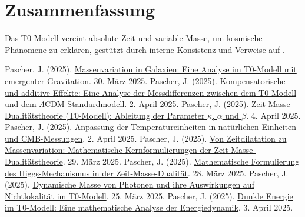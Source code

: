\documentclass[a4paper,12pt]{article}
\theoremstyle{definition}
\theoremstyle{remark}
\begin{document}
	\section{Zusammenfassung}
	
	Das T0-Modell vereint absolute Zeit und variable Masse, um kosmische Phänomene zu erklären, gestützt durch interne Konsistenz und Verweise auf \cite{pascher_galaxies_2025, pascher_params_2025, pascher_messdifferenzen_2025}.
	
	\begin{thebibliography}{99}
		 Pascher, J. (2025). \href{https://github.com/jpascher/T0-Time-Mass-Duality/tree/main/2/pdf/Deutsch/MassVarGalaxien.pdf}{Massenvariation in Galaxien: Eine Analyse im T0-Modell mit emergenter Gravitation}. 30. März 2025.
		 Pascher, J. (2025). \href{https://github.com/jpascher/T0-Time-Mass-Duality/tree/main/2/pdf/Deutsch/MessdifferenzenT0Standard.pdf}{Kompensatorische und additive Effekte: Eine Analyse der Messdifferenzen zwischen dem T0-Modell und dem \(\Lambda\)CDM-Standardmodell}. 2. April 2025.
		 Pascher, J. (2025). \href{https://github.com/jpascher/T0-Time-Mass-Duality/tree/main/2/pdf/Deutsch/ZeitMasseT0Params.pdf}{Zeit-Masse-Dualitätstheorie (T0-Modell): Ableitung der Parameter \(\kappa\), \(\alpha\) und \(\beta\)}. 4. April 2025.
		 Pascher, J. (2025). \href{https://github.com/jpascher/T0-Time-Mass-Duality/tree/main/2/pdf/Deutsch/NatEinheitenAlpha1.pdf}{Anpassung der Temperatureinheiten in natürlichen Einheiten und CMB-Messungen}. 2. April 2025.
		 Pascher, J. (2025). \href{https://github.com/jpascher/T0-Time-Mass-Duality/tree/main/2/pdf/Deutsch/MathZeitMasseLagrange.pdf}{Von Zeitdilatation zu Massenvariation: Mathematische Kernformulierungen der Zeit-Masse-Dualitätstheorie}. 29. März 2025.
		 Pascher, J. (2025). \href{https://github.com/jpascher/T0-Time-Mass-Duality/tree/main/2/pdf/Deutsch/MathHiggsZeitMasse.pdf}{Mathematische Formulierung des Higgs-Mechanismus in der Zeit-Masse-Dualität}. 28. März 2025.
		 Pascher, J. (2025). \href{https://github.com/jpascher/T0-Time-Mass-Duality/tree/main/2/pdf/Deutsch/DynMassePhotonenNichtlokal.pdf}{Dynamische Masse von Photonen und ihre Auswirkungen auf Nichtlokalität im T0-Modell}. 25. März 2025.
		 Pascher, J. (2025). \href{https://github.com/jpascher/T0-Time-Mass-Duality/tree/main/2/pdf/Deutsch/MathEnergiedynamik.pdf}{Dunkle Energie im T0-Modell: Eine mathematische Analyse der Energiedynamik}. 3. April 2025.
	\end{thebibliography}
	
\end{document}

